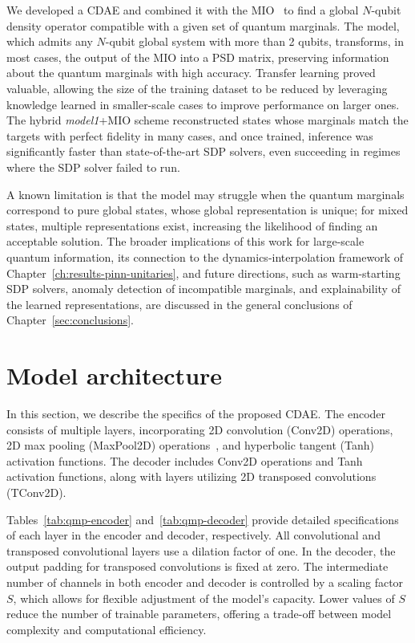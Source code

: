 We developed a CDAE and combined it with the MIO~\cite{uzcategui2022mio} to find a global $N$-qubit density operator compatible with a given set of quantum marginals. The model, which admits any $N$-qubit global system with more than 2 qubits, transforms, in most cases, the output of the MIO into a PSD matrix, preserving information about the quantum marginals with high accuracy. Transfer learning proved valuable, allowing the size of the training dataset to be reduced by leveraging knowledge learned in smaller-scale cases to improve performance on larger ones. The hybrid \textit{model1}+MIO scheme reconstructed states whose marginals match the targets with perfect fidelity in many cases, and once trained, inference was significantly faster than state-of-the-art SDP solvers, even succeeding in regimes where the SDP solver failed to run.

A known limitation is that the model may struggle when the quantum marginals correspond to pure global states, whose global representation is unique; for mixed states, multiple representations exist, increasing the likelihood of finding an acceptable solution. The broader implications of this work for large-scale quantum information, its connection to the dynamics-interpolation framework of Chapter~\ref{ch:results-pinn-unitaries}, and future directions, such as warm-starting SDP solvers, anomaly detection of incompatible marginals, and explainability of the learned representations, are discussed in the general conclusions of Chapter~\ref{sec:conclusions}.

\section{Model architecture}
\label{sec:qmp-architecture}

In this section, we describe the specifics of the proposed CDAE. The encoder consists of multiple layers, incorporating 2D convolution (Conv2D) operations, 2D max pooling (MaxPool2D) operations~\cite{dumoulin2018}, and hyperbolic tangent (Tanh) activation functions. The decoder includes Conv2D operations and Tanh activation functions, along with layers utilizing 2D transposed convolutions (TConv2D).

Tables~\ref{tab:qmp-encoder} and~\ref{tab:qmp-decoder} provide detailed specifications of each layer in the encoder and decoder, respectively. All convolutional and transposed convolutional layers use a dilation factor of one. In the decoder, the output padding for transposed convolutions is fixed at zero. The intermediate number of channels in both encoder and decoder is controlled by a scaling factor $S$, which allows for flexible adjustment of the model's capacity. Lower values of $S$ reduce the number of trainable parameters, offering a trade-off between model complexity and computational efficiency.

